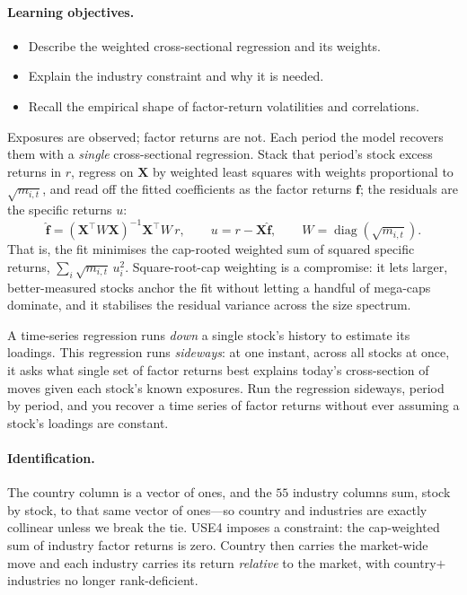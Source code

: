 \documentclass[11pt]{article}
\theoremstyle{definition}
\theoremstyle{plain}
\theoremstyle{remark}
\DeclareMathOperator{\diag}{diag}
\newcommand{\T}{^{\!\top}}
\newcommand{\Xmat}{\mathbf{X}}
\newcommand{\fvec}{\mathbf{f}}
\begin{document}
\paragraph{Learning objectives.}
\begin{itemize}[leftmargin=1.4em,nosep]
  \item Describe the weighted cross-sectional regression and its weights.
  \item Explain the industry constraint and why it is needed.
  \item Recall the empirical shape of factor-return volatilities and correlations.
\end{itemize}

Exposures are observed; factor returns are not. Each period the model recovers them with a \emph{single} cross-sectional regression. Stack that period's stock excess returns in $r$, regress on $\Xmat$ by weighted least squares with weights proportional to $\sqrt{m_{i,t}}$, and read off the fitted coefficients as the factor returns $\fvec$; the residuals are the specific returns $u$:
\[
  \hat{\fvec} = (\Xmat\T W \Xmat)^{-1}\Xmat\T W\, r, \qquad u = r - \Xmat\hat{\fvec}, \qquad W = \diag(\sqrt{m_{i,t}}).
\]
That is, the fit minimises the cap-rooted weighted sum of squared specific returns, $\sum_i \sqrt{m_{i,t}}\, u_i^2$. Square-root-cap weighting is a compromise: it lets larger, better-measured stocks anchor the fit without letting a handful of mega-caps dominate, and it stabilises the residual variance across the size spectrum.

\begin{intuition}
A time-series regression runs \emph{down} a single stock's history to estimate its loadings. This regression runs \emph{sideways}: at one instant, across all stocks at once, it asks what single set of factor returns best explains today's cross-section of moves given each stock's known exposures. Run the regression sideways, period by period, and you recover a time series of factor returns without ever assuming a stock's loadings are constant.
\end{intuition}

\paragraph{Identification.} The country column is a vector of ones, and the $55$ industry columns sum, stock by stock, to that same vector of ones---so country and industries are exactly collinear unless we break the tie. USE4 imposes a constraint: the cap-weighted sum of industry factor returns is zero. Country then carries the market-wide move and each industry carries its return \emph{relative} to the market, with country$+$industries no longer rank-deficient.
\end{document}
